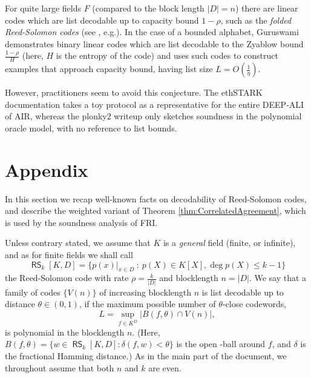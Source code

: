 \documentclass[11pt]{article}
\theoremstyle{definition}
\theoremstyle{remark}
\DeclareMathOperator{\RS}{\mathsf{RS}}
\begin{document}
For quite large fields $F$ (compared to the block length $|D|=n$) there are linear codes which are list decodable up to capacity bound $1-\rho$, such as the \textit{folded Reed-Solomon codes} (see \cite{ListDecodingBook}, e.g.). 
In the case of a bounded alphabet, Guruswami \cite{ListDecodingBook} demonstrates binary linear codes which are list decodable to the Zyablow bound $\frac{1-\rho}{H}$ (here, $H$ is the entropy of the code) and uses such codes to construct examples that approach capacity bound, having list size $L=O\left(\frac{1}{\eta}\right)$. 

However, practitioners seem to avoid this conjecture. 
The ethSTARK documentation \cite{ethSTARK} takes a toy protocol as a representative for the entire DEEP-ALI of AIR,  whereas the plonky2 writeup \cite{PolygonZero} only sketches soundness in the polynomial oracle model, with no reference to list bounds.






\appendix
\newpage

\section{Appendix}
\label{s:Appendix}

In this section we recap well-known facts on decodability of Reed-Solomon codes\footnotemark, and describe the weighted variant of Theorem \ref{thm:CorrelatedAgreement}, which is used by the soundness analysis of FRI.

Unless contrary stated, we assume that $K$ is a \textit{general} field (finite, or infinite), and as for finite fields we shall call
\[ 
\RS_k[K,D]=\big\{p(x)|_{x\in D} \: :\: p(X)\in K[X], \deg p(X)\leq k-1 \big\}
\]
the Reed-Solomon code with rate $\rho=\frac{k}{|D|}$ and blocklength $n=|D|$. 
We say that a family of codes $\{V(n)\}$ of increasing blocklength $n$ is list decodable up to distance $\theta\in (0,1)$, if the maximum possible number of $\theta$-close codewords,
\[
L = \sup_{f\in K^D} \big| B(f,\theta)\cap V(n) \big|,
\]
is polynomial in the blocklength $n$. 
(Here,  $B(f,\theta)= \{w\in \RS_k[K,D] : \delta(f,w)< \theta\}$
 is the open -ball around $f$, and $\delta$ is the fractional Hamming distance.)   
As in the main part of the document, we throughout assume that both $n$ and $k$ are even.
\end{document}
